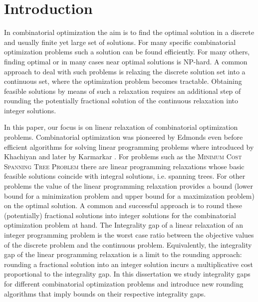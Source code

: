 \nocite{IPbook}
\section{Introduction}\label{chapter:intro}


In combinatorial optimization the aim is to find the optimal solution in a discrete and
usually finite yet large set of solutions. For many specific combinatorial optimization problems such a solution can be found efficiently. For many others, finding optimal or in many cases near optimal solutions is NP-hard. A common approach to deal with such problems is relaxing the discrete solution set into a continuous set, where the optimization problem becomes tractable. Obtaining feasible solutions by means of such a relaxation requires an additional step of rounding the potentially fractional solution of the continuous relaxation into integer solutions.

In this paper, our focus is on linear relaxation of combinatorial
optimization problems. Combinatorial optimization was pioneered by Edmonds even before efficient algorithms for solving linear programming problems where introduced by Khachiyan \cite{Khachiyan} and later by Karmarkar \cite{Karmarkar1984}. For problems such as the \textsc{Minimum Cost Spanning Tree Problem} there are linear programming relaxations whose basic feasible solutions coincide with  integral solutions, i.e. spanning trees. For other problems the value of the linear programming relaxation provides a bound (lower bound for a minimization problem and upper bound for a maximization problem) on the optimal solution. A common and successful approach is to round these (potentially) fractional solutions into integer solutions for the combinatorial optimization problem at hand. The Integrality gap of a linear relaxation of an integer programming problem is the worst case ratio between the objective values of the discrete problem and the continuous problem. Equivalently, the integrality gap of the linear programming relaxation is a limit to the rounding approach: rounding a fractional solution into an integer solution incurs
a multiplicative cost proportional to the integrality gap. In this dissertation we study integrality gaps for different combinatorial optimization problems and introduce new rounding algorithms that imply bounds on their respective integrality gaps. 

